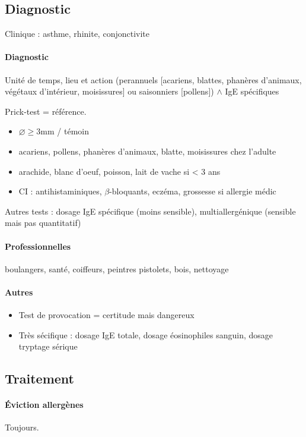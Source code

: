 \subsection{Diagnostic}
Clinique : asthme, rhinite, conjonctivite

\paragraph{Diagnostic}
Unité de temps, lieu et action (perannuels [acariens,
blattes, phanères d'animaux, végétaux d'intérieur, moisissures] ou saisonniers
[pollens]) $\wedge$ IgE spécifiques

Prick-test = référence.
\begin{itemize}
\item $\diameter \ge 3$mm / témoin
\item acariens, pollens, phanères d'animaux, blatte, moisissures chez l'adulte
\item arachide, blanc d'oeuf, poisson, lait de vache si < 3 ans
\item CI : antihistaminiques, $\beta$-bloquants, eczéma, grossesse si
  allergie médic
\end{itemize}

Autres tests : dosage IgE spécifique (moins sensible), multiallergénique (sensible mais
pas quantitatif)

\paragraph{Professionnelles} boulangers, santé, coiffeurs, peintres pistolets, bois, nettoyage\\

\paragraph{Autres}
\begin{itemize}
\item Test de provocation = certitude mais dangereux
\item Très sécifique : dosage IgE totale, dosage éosinophiles sanguin, dosage tryptage sérique
\end{itemize}

\subsection{Traitement}
\paragraph{Éviction allergènes} Toujours.

